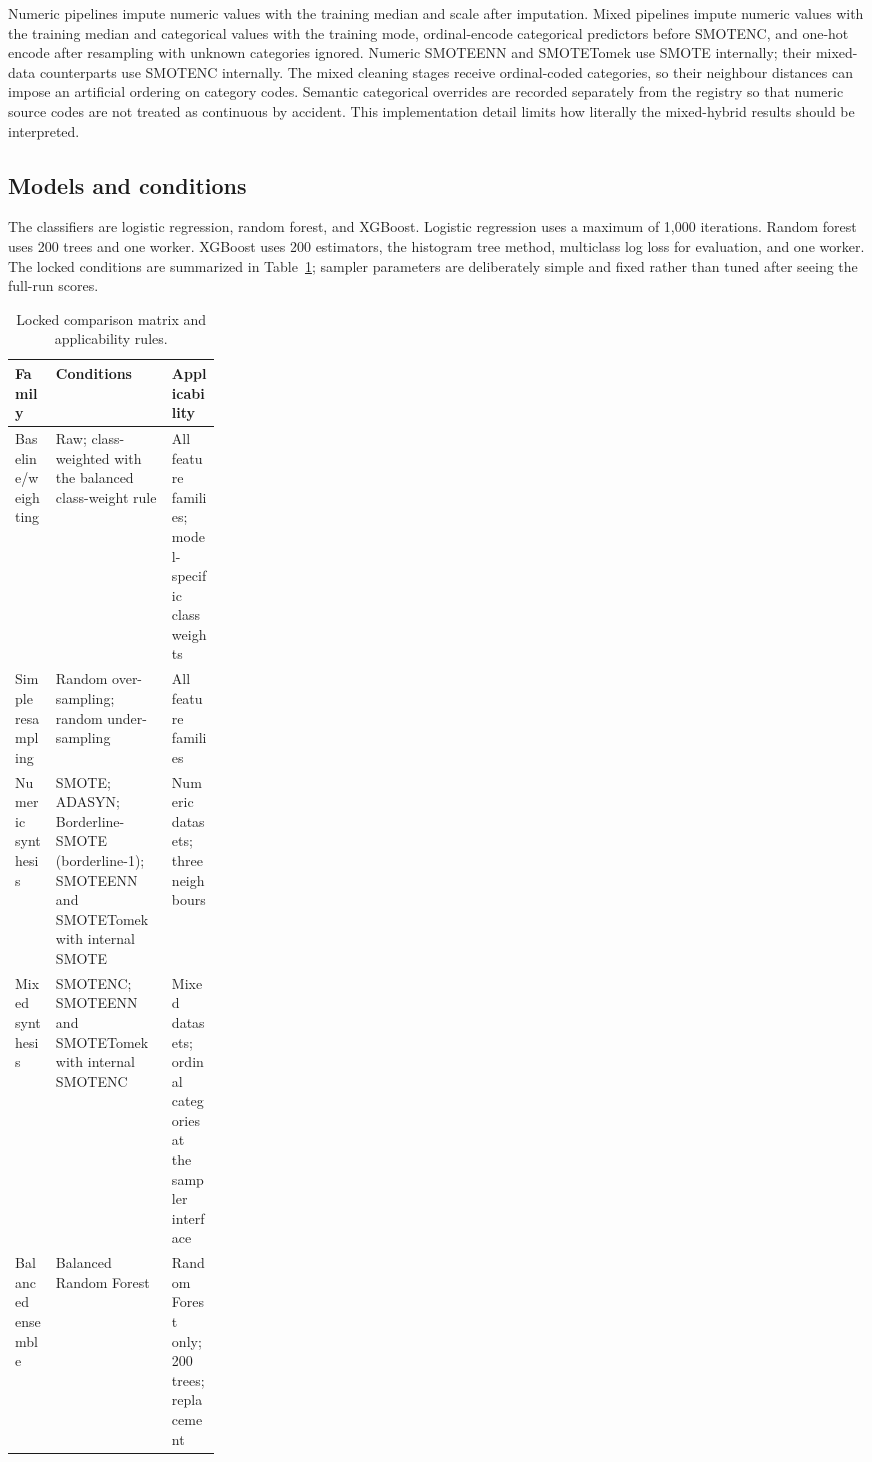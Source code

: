 \documentclass[10pt]{article}
\begin{document}
Numeric pipelines impute numeric values with the training median and scale after imputation. Mixed pipelines impute numeric values with the training median and categorical values with the training mode, ordinal-encode categorical predictors before SMOTENC, and one-hot encode after resampling with unknown categories ignored. Numeric SMOTEENN and SMOTETomek use SMOTE internally; their mixed-data counterparts use SMOTENC internally. The mixed cleaning stages receive ordinal-coded categories, so their neighbour distances can impose an artificial ordering on category codes. Semantic categorical overrides are recorded separately from the registry so that numeric source codes are not treated as continuous by accident. This implementation detail limits how literally the mixed-hybrid results should be interpreted.

\subsection{Models and conditions}

The classifiers are logistic regression, random forest, and XGBoost. Logistic regression uses a maximum of 1,000 iterations. Random forest uses 200 trees and one worker. XGBoost uses 200 estimators, the histogram tree method, multiclass log loss for evaluation, and one worker. The locked conditions are summarized in Table~\ref{tab:conditions}; sampler parameters are deliberately simple and fixed rather than tuned after seeing the full-run scores.

\begin{table}[t]
\centering
\caption{Locked comparison matrix and applicability rules.}
\label{tab:conditions}
\small
\begin{tabularx}{\linewidth}{@{}l>{\raggedright\arraybackslash}X>{\raggedright\arraybackslash}p{0.24\linewidth}@{}}
\toprule
Family & Conditions & Applicability \\
\midrule
Baseline/weighting & Raw; class-weighted with the balanced class-weight rule & All feature families; model-specific class weights \\
Simple resampling & Random over-sampling; random under-sampling & All feature families \\
Numeric synthesis & SMOTE; ADASYN; Borderline-SMOTE (borderline-1); SMOTEENN and SMOTETomek with internal SMOTE & Numeric datasets; three neighbours \\
Mixed synthesis & SMOTENC; SMOTEENN and SMOTETomek with internal SMOTENC & Mixed datasets; ordinal categories at the sampler interface \\
Balanced ensemble & Balanced Random Forest & Random Forest only; 200 trees; replacement \\
\bottomrule
\end{tabularx}
\end{table}
\end{document}
